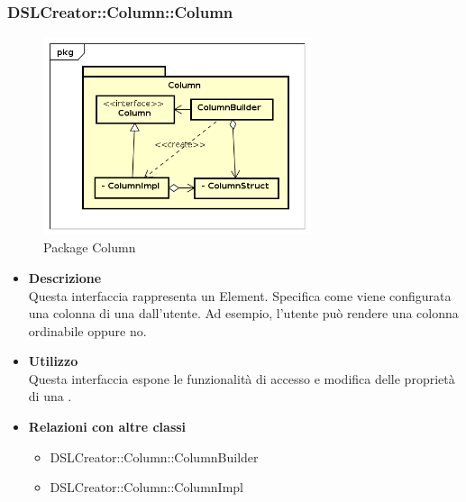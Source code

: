  \subsubsection{DSLCreator::Column::Column}
                 \begin{figure}[H]
                  \centering
                  \includegraphics[width=0.7\textwidth]{res/img/Column.png}
                  \caption{Package Column}
                  \label{fig:diagram_model}
                \end{figure}
                    \begin{itemize}
                        \item \textbf{Descrizione} \hfill \\
                          Questa interfaccia rappresenta un  Element. Specifica come viene configurata una colonna di una  dall'utente. Ad esempio, l'utente può rendere una colonna ordinabile oppure no.
                        \item \textbf{Utilizzo} \hfill \\
                          Questa interfaccia espone le funzionalità di accesso e modifica delle proprietà di una .
                        \item \textbf{Relazioni con altre classi}
                            \begin{itemize}
                              \item DSLCreator::Column::ColumnBuilder
                              \item DSLCreator::Column::ColumnImpl
                            \end{itemize}
                    \end{itemize}  


